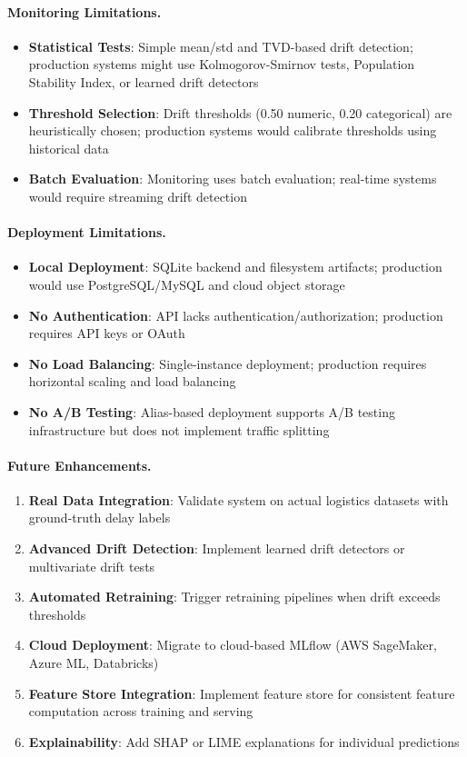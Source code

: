 \documentclass[11pt,a4paper]{article}
\begin{document}
\paragraph{Monitoring Limitations.}
\begin{itemize}
    \item \textbf{Statistical Tests}: Simple mean/std and TVD-based drift detection; production systems might use Kolmogorov-Smirnov tests, Population Stability Index, or learned drift detectors
    \item \textbf{Threshold Selection}: Drift thresholds (0.50 numeric, 0.20 categorical) are heuristically chosen; production systems would calibrate thresholds using historical data
    \item \textbf{Batch Evaluation}: Monitoring uses batch evaluation; real-time systems would require streaming drift detection
\end{itemize}

\paragraph{Deployment Limitations.}
\begin{itemize}
    \item \textbf{Local Deployment}: SQLite backend and filesystem artifacts; production would use PostgreSQL/MySQL and cloud object storage
    \item \textbf{No Authentication}: API lacks authentication/authorization; production requires API keys or OAuth
    \item \textbf{No Load Balancing}: Single-instance deployment; production requires horizontal scaling and load balancing
    \item \textbf{No A/B Testing}: Alias-based deployment supports A/B testing infrastructure but does not implement traffic splitting
\end{itemize}

\paragraph{Future Enhancements.}
\begin{enumerate}
    \item \textbf{Real Data Integration}: Validate system on actual logistics datasets with ground-truth delay labels
    \item \textbf{Advanced Drift Detection}: Implement learned drift detectors or multivariate drift tests
    \item \textbf{Automated Retraining}: Trigger retraining pipelines when drift exceeds thresholds
    \item \textbf{Cloud Deployment}: Migrate to cloud-based MLflow (AWS SageMaker, Azure ML, Databricks)
    \item \textbf{Feature Store Integration}: Implement feature store for consistent feature computation across training and serving
    \item \textbf{Explainability}: Add SHAP or LIME explanations for individual predictions
\end{enumerate}
\end{document}
